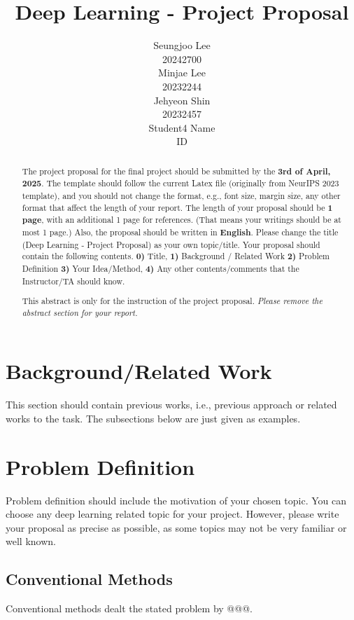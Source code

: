 \documentclass{article}
\title{Deep Learning - Project Proposal}
\author{%
Seungjoo Lee \\
20242700\\
\And
Minjae Lee \\
20232244\\
\And
Jehyeon Shin \\
20232457\\
\And
Student4 Name \\
ID
}
\begin{document}
\maketitle


\begin{abstract}
  The project proposal for the final project should be submitted by the \textbf{3rd of April, 2025}.
  The template should follow the current Latex file (originally from NeurIPS 2023 template), and you should not change the format, e.g., font size, margin size, any other format that affect the length of your report.
  The length of your proposal should be \textbf{1 page}, with an additional 1 page for references.
  (That means your writings should be at most 1 page.)
  Also, the proposal should be written in \textbf{English}.
  Please change the title (Deep Learning - Project Proposal) as your own topic/title.
  Your proposal should contain the following contents.
  \textbf{0)} Title,
  \textbf{1)} Background / Related Work
  \textbf{2)} Problem Definition 
  \textbf{3)} Your Idea/Method,
  \textbf{4)} Any other contents/comments that the Instructor/TA should know.
  

  This abstract is only for the instruction of the project proposal.
  \textit{Please remove the abstract section for your report.}
\end{abstract}

\section{Background/Related Work}
This section should contain previous works, i.e., previous approach or related works to the task. The subsections below are just given as examples.

\section{Problem Definition}
Problem definition should include the motivation of your chosen topic.
You can choose any deep learning related topic for your project.
However, please write your proposal as precise as possible, as some topics may not be very familiar or well known.



\subsection{Conventional Methods}
Conventional methods dealt the stated problem by @@@.
\end{document}
